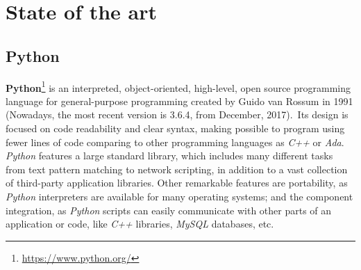\documentclass[a4paper, 12pt]{book}
\begin{document}
\chapter{State of the art}
\label{sec:state-art}
\section{Python}
\label{sec:python}
\textbf{Python}\footnote{\url{https://www.python.org/}} is an interpreted, object-oriented, high-level, open source
programming language for general-purpose programming created by Guido van Rossum in 1991 (Nowadays, the most
recent version is 3.6.4, from December, 2017).\ Its design is focused on code readability and clear syntax, making
possible to program using fewer lines of code comparing to other programming languages as \emph{C++} or \emph{Ada}.\\
\emph{Python} features a large standard library, which includes many different tasks from text pattern matching to network
scripting, in addition to a vast collection of third-party application libraries.
Other remarkable features are portability, as \emph{Python} interpreters are available for many operating systems;
and the component integration, as \emph{Python} scripts can easily communicate with other parts of an application or code,
like \emph{C++} libraries, \emph{MySQL} databases, etc.\\
\end{document}
